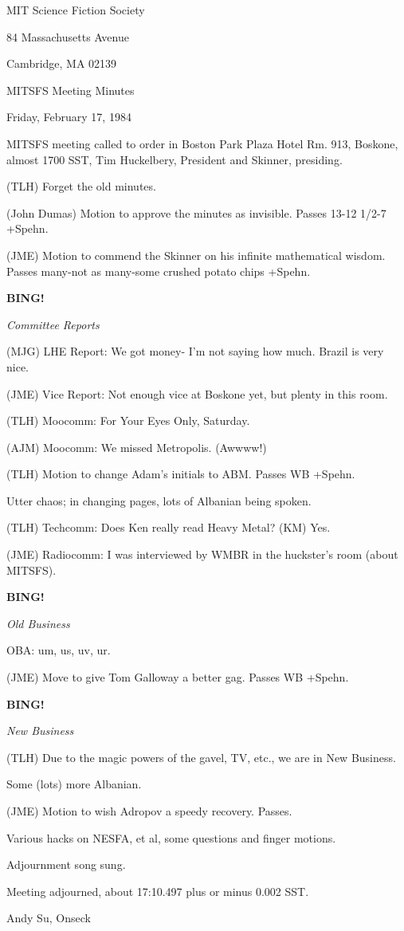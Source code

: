 \documentclass[12pt]{article}
\newcommand{\bing}{{\bf BING!} }
\newcommand{\goto}[1]{\bing \vskip 12pt \centerline{{\em{#1}}}}
\begin{document}
\begin{center}

MIT Science Fiction Society 

84 Massachusetts Avenue

Cambridge, MA 02139

\vspace{12pt}

MITSFS Meeting Minutes 

Friday, February 17, 1984

\end{center}
 
\vspace{18pt}

\setlength{\parskip}{6pt}

\noindent
MITSFS meeting called to order in Boston Park Plaza Hotel Rm. 913, Boskone, almost 1700 SST,
Tim Huckelbery, President and Skinner, presiding.

(TLH) Forget the old minutes.

(John Dumas) Motion to approve the minutes as invisible. Passes 13-12 1/2-7 +Spehn.

(JME) Motion to commend the Skinner on his infinite mathematical wisdom. Passes many-not as many-some crushed potato chips +Spehn.

\goto{Committee Reports}

(MJG) LHE Report: We got money- I'm not saying how much. Brazil is very nice.

(JME) Vice Report: Not enough vice at Boskone yet, but plenty in this room.

(TLH) Moocomm: For Your Eyes Only, Saturday.

(AJM) Moocomm: We missed Metropolis. (Awwww!)

(TLH) Motion to change Adam's initials to ABM. Passes WB +Spehn.

Utter chaos; in changing pages, lots of Albanian being spoken.

(TLH) Techcomm: Does Ken really read Heavy Metal? (KM) Yes.

(JME) Radiocomm: I was interviewed by WMBR in the huckster's room (about MITSFS).

\goto{Old Business}

OBA: um, us, uv, ur.

(JME) Move to give Tom Galloway a better gag. Passes WB +Spehn.

\goto{New Business}

(TLH) Due to the magic powers of the gavel, TV, etc., we are in New Business.

Some (lots) more Albanian.

(JME) Motion to wish Adropov a speedy recovery. Passes.

Various hacks on NESFA, et al, some questions and finger motions.

Adjournment song sung.

\vspace{12pt}

\noindent
Meeting adjourned, about 17:10.497 plus or minus 0.002 SST.

\vspace{18pt}

\centerline{Andy Su, Onseck}
\end{document}
